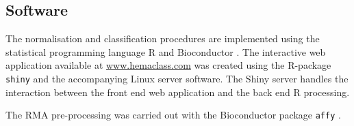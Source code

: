 \documentclass[10pt]{bmc_article}
\newenvironment{bmcformat}{\fussy\setboolean{publ}{true}}{\fussy}
\begin{document}
\begin{bmcformat}
\subsection*{Software}
The normalisation and classification procedures are implemented using the statistical programming language R \cite{RCoreTeam2013} and Bioconductor \cite{Gentleman2004}. The interactive web application available at \url{www.hemaclass.com} was created using the R-package \texttt{shiny} \cite{RStudio2013} and the accompanying Linux server software. The Shiny server handles the interaction between the front end web application and the back end R processing.

The RMA pre-processing was carried out with the Bioconductor package \texttt{affy} \cite{Gautier2004}. %


\end{bmcformat}
\end{document}
